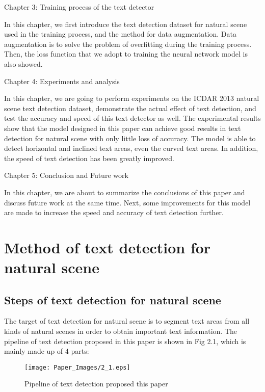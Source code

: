 \documentclass[22pt, UTF8]{article}
\numberwithin{figure}{section}
\numberwithin{table}{section}
\numberwithin{equation}{section} %
\begin{document}
\setlength\parindent{2em} Chapter 3: Training process of the text detector

\setlength\parindent{2em} In this chapter, we first introduce the text detection dataset for natural scene used in the training process, and the method for data augmentation. Data augmentation is to solve the problem of overfitting during the training process. Then, the loss function that we adopt to training the neural network model is also showed.

\setlength\parindent{2em} Chapter 4: Experiments and analysis

\setlength\parindent{2em} In this chapter, we are going to perform experiments on the ICDAR 2013 natural scene text detection dataset, demonstrate the actual effect of text detection, and test the accuracy and speed of this text detector as well. The experimental results show that the model designed in this paper can achieve good results in text detection for natural scene with only little loss of accuracy. The model is able to detect horizontal and inclined text areas, even the curved text areas. In addition, the speed of text detection has been greatly improved.

\setlength\parindent{2em} Chapter 5: Conclusion and Future work

\setlength\parindent{2em} In this chapter, we are about to summarize the conclusions of this paper and discuss future work at the same time. Next, some improvements for this model are made to increase the speed and accuracy of text detection further.

\newpage

\section{Method of text detection for natural scene}

\subsection{Steps of text detection for natural scene}

\setlength\parindent{2em} The target of text detection for natural scene is to segment text areas from all kinds of natural scenes in order to obtain important text information. The pipeline of text detection proposed in this paper is shown in Fig 2.1, which is mainly made up of 4 parts:

\begin{figure}[htbp]
    \begin{center}
        \texttt{[image: Paper\_Images/2\_1.eps]}
    \end{center}
    \vspace{-3mm} %
    \caption{Pipeline of text detection proposed this paper}
    \vspace{-2mm} %
\end{figure}
\end{document}
